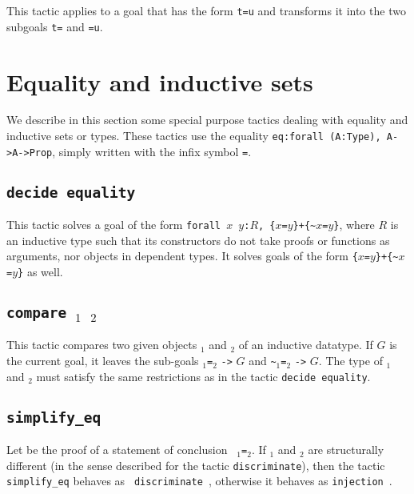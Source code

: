 \begin{coq_example*}
This tactic applies to a goal that has the form {\tt t=u}
and transforms it into the two subgoals
{\tt t={\term}} and {\tt {\term}=u}.

\section{Equality and inductive sets}

We describe in this section some special purpose tactics dealing with
equality and inductive sets or types. These tactics use the equality
{\tt eq:forall (A:Type), A->A->Prop}, simply written with the
infix symbol {\tt =}.

\subsection{\tt decide equality}
\label{decideequality}

This tactic solves a goal of the form
{\tt forall $x$ $y$:$R$, \{$x$=$y$\}+\{\verb|~|$x$=$y$\}}, where $R$
is an inductive type such that its constructors do not take proofs or
functions as arguments, nor objects in dependent types.
It solves goals of the form {\tt \{$x$=$y$\}+\{\verb|~|$x$=$y$\}} as well.

\subsection{\tt compare \term$_1$ \term$_2$}

This tactic compares two given objects \term$_1$ and \term$_2$
of an inductive datatype. If $G$ is the current goal, it leaves the sub-goals
\term$_1${\tt =}\term$_2$ {\tt ->} $G$ and \verb|~|\term$_1${\tt =}\term$_2$
{\tt ->} $G$. The type
of \term$_1$ and \term$_2$ must satisfy the same restrictions as in the tactic
\texttt{decide equality}.

\subsection{\tt simplify\_eq \term}
\label{simplify-eq}

Let {\term} be the proof of a statement of conclusion {\tt
  {\term$_1$}={\term$_2$}}. If {\term$_1$} and
{\term$_2$} are structurally different (in the sense described for the
tactic {\tt discriminate}), then the tactic {\tt simplify\_eq} behaves as {\tt
  discriminate {\term}}, otherwise it behaves as {\tt injection
  {\term}}.


\end{coq_example*}
